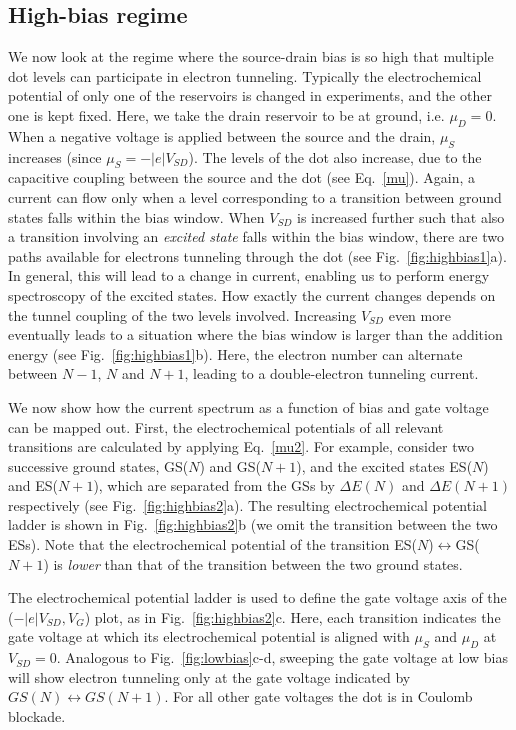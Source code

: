 \documentclass[rmp,twocolumn,aps]{revtex4}
\begin{document}
\subsection{High-bias regime}
We now look at the regime where the source-drain bias is so high
that multiple dot levels can participate in electron tunneling.
Typically the electrochemical potential of only one of the
reservoirs is changed in experiments, and the other one is kept
fixed. Here, we take the drain reservoir to be at ground, i.e.
$\mu_D=0$. When a negative voltage is applied between the source
and the drain, $\mu_S$ increases (since $\mu_S= -\left|e\right|
V_{SD}$). The levels of the dot also increase, due to the
capacitive coupling between the source and the dot (see
Eq.~\ref{mu}). Again, a current can flow only when a level
corresponding to a transition between ground states falls within
the bias window. When $V_{SD}$ is increased further such that also
a transition involving an \textit{excited state} falls within the
bias window, there are two paths available for electrons tunneling
through the dot (see Fig.~\ref{fig:highbias1}a). In general, this
will lead to a change in current, enabling us to perform energy
spectroscopy of the excited states. How exactly the current
changes depends on the tunnel coupling of the two levels involved.
Increasing $V_{SD}$ even more eventually leads to a situation
where the bias window is larger than the addition energy (see
Fig.~\ref{fig:highbias1}b). Here, the electron number can
alternate between $N-1$, $N$ and $N\!+\!1$, leading to a
double-electron tunneling current.

We now show how the current spectrum as a function of bias and
gate voltage can be mapped out. First, the electrochemical
potentials of all relevant transitions are calculated by applying
Eq.~\ref{mu2}. For example, consider two successive ground
states, GS($N$) and GS($N\!+\!1$), and the excited states ES($N$)
and ES($N\!+\!1$), which are separated from the GSs by $\Delta
E(N)$ and $\Delta E(N\!+\!1)$ respectively (see
Fig.~\ref{fig:highbias2}a). The resulting electrochemical
potential ladder is shown in Fig.~\ref{fig:highbias2}b (we omit
the transition between the two ESs). Note that the electrochemical
potential of the transition ES($N$)$\leftrightarrow$GS($N\!+\!1$)
is \textit{lower} than that of the transition between the two
ground states.

The electrochemical potential ladder is used to define the gate
voltage axis of the ($-\left|e\right|V_{SD},{V_G}$) plot, as in
Fig.~\ref{fig:highbias2}c. Here, each transition indicates the
gate voltage at which its electrochemical potential is aligned
with $\mu_S$ and $\mu_D$ at $V_{SD}=0$. Analogous to
Fig.~\ref{fig:lowbias}c-d, sweeping the gate voltage at low bias
will show electron tunneling only at the gate voltage indicated by
$GS(N)\leftrightarrow GS(N\!+\!1)$. For all other gate voltages
the dot is in Coulomb blockade.
\end{document}
